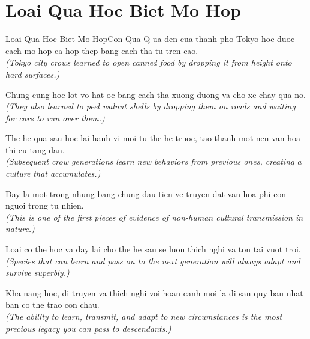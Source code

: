 \section{Loai Qua Hoc Biet Mo Hop}
\begin{truyen}{Loai Qua Hoc Biet Mo Hop}{Con Qua}
Q ua den cua thanh pho Tokyo hoc duoc cach mo hop ca hop thep bang cach tha tu tren cao.\\
\textit{(Tokyo city crows learned to open canned food by dropping it from height onto hard surfaces.)}

Chung cung hoc lot vo hat oc bang cach tha xuong duong va cho xe chay qua no.\\
\textit{(They also learned to peel walnut shells by dropping them on roads and waiting for cars to run over them.)}

The he qua sau hoc lai hanh vi moi tu the he truoc, tao thanh mot nen van hoa thi cu tang dan.\\
\textit{(Subsequent crow generations learn new behaviors from previous ones, creating a culture that accumulates.)}

Day la mot trong nhung bang chung dau tien ve truyen dat van hoa phi con nguoi trong tu nhien.\\
\textit{(This is one of the first pieces of evidence of non-human cultural transmission in nature.)}

Loai co the hoc va day lai cho the he sau se luon thich nghi va ton tai vuot troi.\\
\textit{(Species that can learn and pass on to the next generation will always adapt and survive superbly.)}

\end{truyen}
\begin{baihoc}
  Kha nang hoc, di truyen va thich nghi voi hoan canh moi la di san quy bau nhat ban co the trao con chau.\\
  \textit{(The ability to learn, transmit, and adapt to new circumstances is the most precious legacy you can pass to descendants.)}
\end{baihoc}
